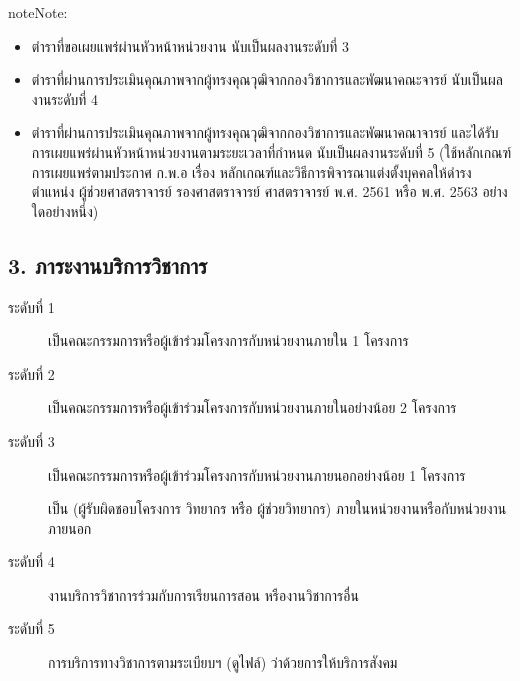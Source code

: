 \documentclass[a4paper,12pt,english]{sphinxmanual}
\begin{document}
\begin{sphinxadmonition}{note}{Note:}\begin{itemize}
\item {} 
ตำราที่ขอเผยแพร่ผ่านหัวหน้าหน่วยงาน นับเป็นผลงานระดับที่ 3

\item {} 
ตำราที่ผ่านการประเมินคุณภาพจากผู้ทรงคุณวุฒิจากกองวิชาการและพัฒนาคณะจารย์ นับเป็นผลงานระดับที่ 4

\item {} 
ตำราที่ผ่านการประเมินคุณภาพจากผู้ทรงคุณวุฒิจากกองวิชาการและพัฒนาคณาจารย์ และได้รับการเผยแพร่ผ่านหัวหน้าหน่วยงานตามระยะเวลาที่กำหนด นับเป็นผลงานระดับที่ 5 (ใช้หลักเกณฑ์การเผยแพร่ตามประกาศ ก.พ.อ เรื่อง หลักเกณฑ์และวิธีการพิจารณาแต่งตั้งบุคคลให้ดำรง ตำแหน่ง ผู้ช่วยศาสตราจารย์ รองศาสตราจารย์ ศาสตราจารย์ พ.ศ. 2561 หรือ พ.ศ. 2563 อย่างใดอย่างหนึ่ง)

\end{itemize}
\end{sphinxadmonition}


\subsection{3. ภาระงานบริการวิชาการ}
\label{\detokenize{submission_part1:id17}}\begin{description}
\item[{ระดับที่ 1}] \leavevmode
เป็นคณะกรรมการหรือผู้เข้าร่วมโครงการกับหน่วยงานภายใน 1 โครงการ

\item[{ระดับที่ 2}] \leavevmode
เป็นคณะกรรมการหรือผู้เข้าร่วมโครงการกับหน่วยงานภายในอย่างน้อย 2 โครงการ

\item[{ระดับที่ 3}] \leavevmode
เป็นคณะกรรมการหรือผู้เข้าร่วมโครงการกับหน่วยงานภายนอกอย่างน้อย 1 โครงการ

 เป็น {\hyperref[\detokenize{glossary:term-5}]{}} (ผู้รับผิดชอบโครงการ วิทยากร หรือ ผู้ช่วยวิทยากร) ภายในหน่วยงานหรือกับหน่วยงานภายนอก

\item[{ระดับที่ 4}] \leavevmode
{\hyperref[\detokenize{glossary:term-11}]{}} งานบริการวิชาการร่วมกับการเรียนการสอน หรืองานวิชาการอื่น

\end{description}
\begin{description}
\item[{ระดับที่ 5}] \leavevmode
การบริการทางวิชาการตามระเบียบฯ (ดูไฟล์) ว่าด้วยการให้บริการสังคม

\end{description}
\end{document}
